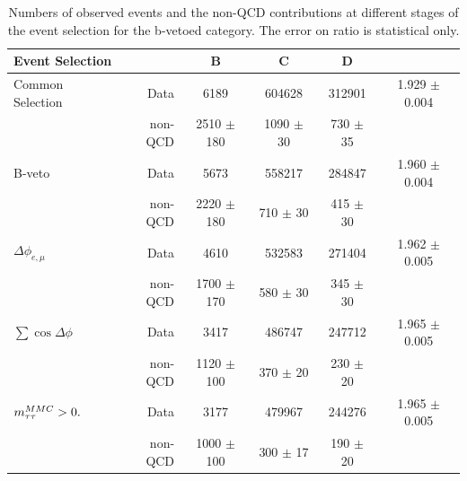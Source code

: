 \begin{table} [!tp]
	\caption{Numbers of observed events and the  non-QCD contributions at different stages of the event selection for the b-vetoed category. 
	The error on  \rqcd ratio is statistical only.}
\begin{small}
	\begin{tabular}[c]{l r c c c c}
\hline
\hline 
Event Selection  &  		& B & C & D &  \rqcd \\ 
\hline
Common Selection 	&   Data	&6189			&604628			&312901		    &	1.929 $\pm$  	0.004		\\
	        &   non-QCD	&2510 $\pm$  180  	&1090 $\pm$   30  	&730	$\pm$ 35    &				\\
\hline
B-veto	     	&   Data	&5673		  & 558217 		& 284847		    &	1.960	$\pm$	0.004	\\
	     	&   non-QCD	&2220	$\pm$ 180 & 710 $\pm$ 30	& 415 $\pm$	30	    &				\\
\hline
$\Delta\phi_{e,\mu}$  &   Data		&4610		&532583 		&271404		    	    &	1.962	$\pm$	0.005	\\
	     &   non-QCD	&1700 $\pm$170	&580 $\pm$	30	& 345 $\pm$	30	    &				\\
\hline
$\sum\cos\Delta\phi$ &   Data& 3417	&486747 		& 247712	   		    &	1.965	$\pm$	0.005 	\\
	     &   non-QCD     & 1120  $\pm$ 100	& 370 $\pm$ 	20		& 230 $\pm$	20  &				\\
\hline
$m_{\tau\tau}^{MMC} > 0.$    &  Data		& 3177		& 479967 		& 244276	    	    &	1.965	$\pm$	0.005	\\
	     &   non-QCD	& 1000 $\pm$ 100	& 300  $\pm$ 17		&190	$\pm$ 20    &			\\[1ex]
\hline
\hline
	\end{tabular}
\end{small}
	\centering
	\label{table:qcd_yield_bveto}
\end{table}

